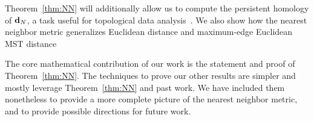 Theorem~\ref{thm:NN} will additionally allow us
to compute the persistent homology of $\mathbf{d}_N$, a task useful for
topological data analysis~\cite{edelsbrunner02topological}.
We also show how the nearest neighbor metric generalizes Euclidean
distance and maximum-edge Euclidean MST distance ~\cite{LiWan2001}

The core mathematical contribution of our work is the
statement and proof of Theorem~\ref{thm:NN}.  The techniques to prove
our other results are simpler and mostly leverage Theorem~\ref{thm:NN} and
past work. We have included them nonetheless to provide a more complete
picture of the nearest neighbor metric, and to provide possible directions for future
work.

